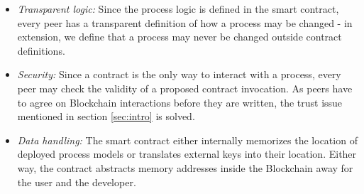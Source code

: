 \begin{itemize}
    \item \emph{Transparent logic:} Since the process logic is defined in the smart contract, every peer has a transparent definition of how a process may be changed - in extension, we define that a process may never be changed outside contract definitions.
    \item \emph{Security:} Since a contract is the only way to interact with a process, every peer may check the validity of a proposed contract invocation. As peers have to agree on Blockchain interactions before they are written, the trust issue mentioned in section \ref{sec:intro} is solved.
    \item \emph{Data handling:} The smart contract either internally memorizes the location of deployed process models or translates external keys into their location. Either way, the contract abstracts memory addresses inside the Blockchain away for the user and the developer.
\end{itemize}